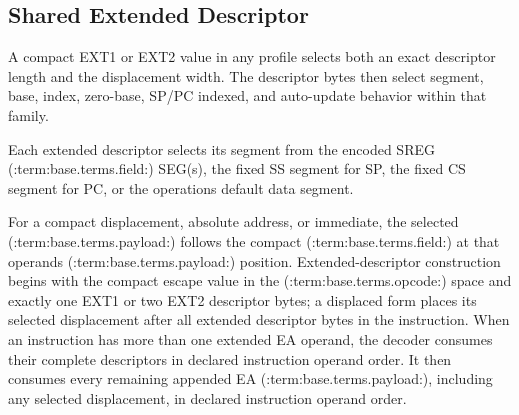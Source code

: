 \subsection{Shared Extended Descriptor}
A compact EXT1 or EXT2 value in any profile selects both an exact descriptor length and the displacement width. The descriptor
bytes then select segment, base, index, zero-base, SP/PC indexed, and auto-update behavior within that family.

Each extended descriptor selects its segment from the encoded SREG (:term:base.terms.field:) SEG(s), the fixed SS segment for SP, the fixed CS
segment for PC, or the operation\textquotesingle{}s default data segment.

For a compact displacement, absolute address, or immediate, the selected (:term:base.terms.payload:) follows the compact (:term:base.terms.field:) at that
operand\textquotesingle{}s (:term:base.terms.payload:) position. Extended-descriptor construction begins with the compact escape value in the (:term:base.terms.opcode:)
space and exactly one EXT1 or two EXT2 descriptor bytes; a displaced form places its selected displacement after
all extended descriptor bytes in the instruction. When an instruction has more than one extended EA operand, the decoder consumes
their complete descriptors in declared instruction operand order. It then consumes every remaining appended EA (:term:base.terms.payload:),
including any selected displacement, in declared instruction operand order.

\clearpage
